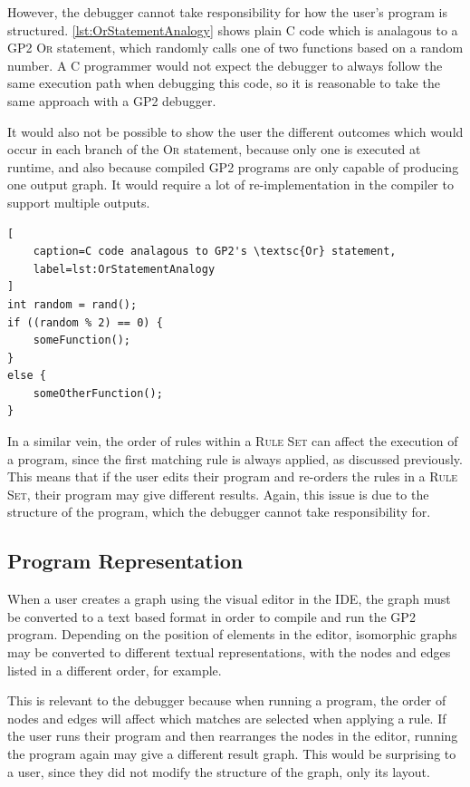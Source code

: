 \documentclass[authoryearcitations]{UoYCSproject}
\begin{document}
However, the debugger cannot take responsibility for how the user's program
is structured. \autoref{lst:OrStatementAnalogy} shows plain C code which is
analagous to a GP2 \textsc{Or} statement, which randomly calls one of two
functions based on a random number. A C programmer would not expect the
debugger to always follow the same execution path when debugging this code,
so it is reasonable to take the same approach with a GP2 debugger.

It would also not be possible to show the user the different outcomes which
would occur in each branch of the \textsc{Or} statement, because only one is
executed at runtime, and also because compiled GP2 programs are only capable
of producing one output graph. It would require a lot of re-implementation in
the compiler to support multiple outputs.

\begin{lstlisting}[
    caption=C code analagous to GP2's \textsc{Or} statement,
    label=lst:OrStatementAnalogy
]
int random = rand();
if ((random % 2) == 0) {
    someFunction();
}
else {
    someOtherFunction();
}
\end{lstlisting}

In a similar vein, the order of rules within a \textsc{Rule Set} can affect the
execution of a program, since the first matching rule is always applied, as
discussed previously. This means that if the user edits their program and
re-orders the rules in a \textsc{Rule Set}, their program may give different
results. Again, this issue is due to the structure of the program, which the
debugger cannot take responsibility for.


\subsection{Program Representation}
\label{sec:ProgramRepresentation}

When a user creates a graph using the visual editor in the IDE, the graph must
be converted to a text based format in order to compile and run the GP2 program.
Depending on the position of elements in the editor, isomorphic graphs may be
converted to different textual representations, with the nodes and edges listed
in a different order, for example.

This is relevant to the debugger because when running a program, the order of
nodes and edges will affect which matches are selected when applying a rule. If
the user runs their program and then rearranges the nodes in the editor, running
the program again may give a different result graph. This would be surprising to
a user, since they did not modify the structure of the graph, only its layout.
\end{document}
